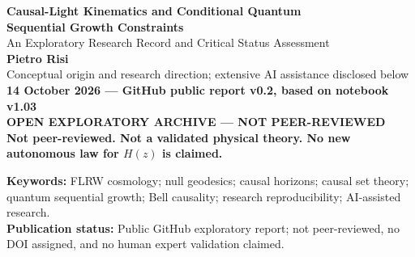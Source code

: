 \documentclass[11pt,a4paper]{article}
\newcommand{\alert}{\textbf{\textcolor{red!65!black}{OPEN EXPLORATORY ARCHIVE --- NOT PEER-REVIEWED}}}
\begin{document}
\begin{center}
{\Large\bfseries Causal-Light Kinematics and Conditional Quantum\\Sequential Growth Constraints}\\[7pt]
{\large An Exploratory Research Record and Critical Status Assessment}\\[13pt]
{\normalsize \textbf{Pietro Risi}}\\
{\small Conceptual origin and research direction; extensive AI assistance disclosed below}\\[10pt]
\textbf{14 October 2026 --- GitHub public report v0.2, based on notebook v1.03}\\[8pt]
\alert\\[4pt]
\textbf{Not peer-reviewed. Not a validated physical theory. No new autonomous law for $H(z)$ is claimed.}
\end{center}
\vspace{7pt}
\begin{abstract}
This record documents an exploratory, human-directed and substantially AI-assisted investigation originating from the heuristic ``$c+c$'' picture of cosmic expansion. In a Friedmann--Lema\^itre--Robertson--Walker (FLRW) spacetime, signed separations of counter-propagating radial null rays can contain a $2c$ term, while the proper separation of co-propagating rays evolves with the scale factor. These statements are standard kinematical identities, not a novel law of expansion. Subsequent studies of horizon thermodynamics, causal-volume models, causal sets, Benincasa--Dowker-type actions, and quantum sequential growth did not yield a self-contained gravitational measure or an autonomous prediction of $H(z)$. The mathematical work on non-singular Hermitian $2\times2$ growth operators is conditional on a strong operator formulation of Markov sum rules, general covariance, and ordered Bell causality. A correction issued in notebook v1.03 shows that an apparent exceptional family satisfying restrictions on antichain generators fails more general necessary identities of the underlying quantum sequential growth formalism. Elementary finite-dimensional counterexamples also distinguish equality on an initial state from equality as operators. This manuscript is a transparent status report, not a claim of new physical discovery. AI-generated computational checks, an AI-based critical review, and a subsequent AI-based citation audit are documented. No human peer review or independent human verification of the central arguments is documented.
\end{abstract}
\noindent\textbf{Keywords:} FLRW cosmology; null geodesics; causal horizons; causal set theory; quantum sequential growth; Bell causality; research reproducibility; AI-assisted research.\\[3pt]
\noindent\textbf{Publication status:} Public GitHub exploratory report; not peer-reviewed, no DOI assigned, and no human expert validation claimed.
\end{document}
